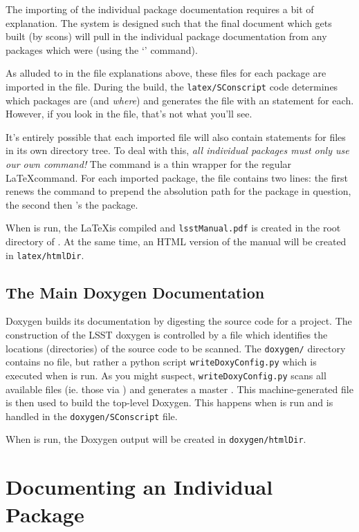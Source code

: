 The importing of the individual package documentation requires a bit
of explanation.  The system is designed such that the final document
which gets built (by scons) will pull in the individual package
documentation from any packages which were \ttsetup (using the
\tteups `\ttsetup' command).

As alluded to in the file explanations above, these \tttex files for
each package are imported in the \ttlsstpackages file.
During the build, the \texttt{latex/SConscript} code determines which
packages are \ttsetup (and {\itshape where}) and generates the
\ttlsstpackages file with an \ttinput statement for each.  However, if
you look in the \ttlsstpackages file, that's not what you'll see.

It's entirely possible that each imported \tttex file will also
contain \ttinput statements for files in its own directory tree.  To
deal with this, {\itshape all individual packages must only use our
  own \ttlsstinput command!}  The \ttlsstinput command is a thin
wrapper for the regular \LaTeX \ttinput command.  For each imported
package, the \ttlsstpackages file contains two lines: the first renews
the \ttlsstinput command to prepend the absolution path for the
package in question, the second then \ttlsstinput's the package.

When \ttscons is run, the \LaTeX is compiled and
\texttt{lsstManual.pdf} is created in the root directory of
\ttdevenvdoc.  At the same time, an HTML version of the manual will be
created in \texttt{latex/htmlDir}.

\subsection{The Main Doxygen Documentation\label{sec-maindoxygen}}

Doxygen builds its documentation by digesting the source code for a
project.  The construction of the LSST doxygen is controlled by a
\ttdoxygenconf file which identifies the locations (directories) of the
source code to be scanned.  The \ttdevenvdoc \texttt{doxygen/}
directory contains no \ttdoxygenconf file, but rather a python script
\texttt{writeDoxyConfig.py} which is executed when \ttscons is run.
As you might suspect, \texttt{writeDoxyConfig.py} scans all available
\ttdoxygenconf files (ie. those \ttsetup via \tteups) and generates a
master \ttdoxygenconf.  This machine-generated file is then used to
build the top-level Doxygen.  This happens when \ttscons is run and is
handled in the \texttt{doxygen/SConscript} file.

When \ttscons is run, the Doxygen output will be created in
\texttt{doxygen/htmlDir}.


\section{Documenting an Individual Package\label{sec-packagedoc}}



